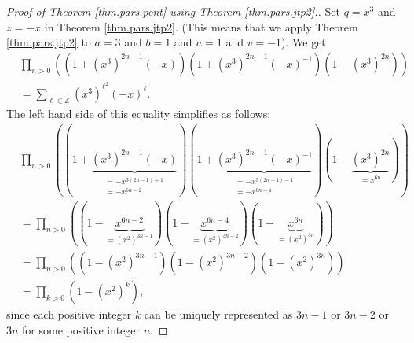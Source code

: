 \begin{proof}
[Proof of Theorem \ref{thm.pars.pent} using Theorem \ref{thm.pars.jtp2}.]Set
$q=x^{3}$ and $z=-x$ in Theorem \ref{thm.pars.jtp2}. (This means that we apply
Theorem \ref{thm.pars.jtp2} to $a=3$ and $b=1$ and $u=1$ and $v=-1$). We get%
\begin{align}
&  \prod_{n>0}\left(  \left(  1+\left(  x^{3}\right)  ^{2n-1}\left(
-x\right)  \right)  \left(  1+\left(  x^{3}\right)  ^{2n-1}\left(  -x\right)
^{-1}\right)  \left(  1-\left(  x^{3}\right)  ^{2n}\right)  \right)
\nonumber\\
&  =\sum_{\ell\in\mathbb{Z}}\left(  x^{3}\right)  ^{\ell^{2}}\left(
-x\right)  ^{\ell}. \label{pf.thm.pars.pent.1}%
\end{align}
The left hand side of this equality simplifies as follows:%
\begin{align*}
&  \prod_{n>0}\left(  \left(  1+\underbrace{\left(  x^{3}\right)
^{2n-1}\left(  -x\right)  }_{\substack{=-x^{3\left(  2n-1\right)
+1}\\=-x^{6n-2}}}\right)  \left(  1+\underbrace{\left(  x^{3}\right)
^{2n-1}\left(  -x\right)  ^{-1}}_{\substack{=-x^{3\left(  2n-1\right)
-1}\\=-x^{6n-4}}}\right)  \left(  1-\underbrace{\left(  x^{3}\right)  ^{2n}%
}_{=x^{6n}}\right)  \right) \\
&  =\prod_{n>0}\left(  \left(  1-\underbrace{x^{6n-2}}_{=\left(  x^{2}\right)
^{3n-1}}\right)  \left(  1-\underbrace{x^{6n-4}}_{=\left(  x^{2}\right)
^{3n-2}}\right)  \left(  1-\underbrace{x^{6n}}_{=\left(  x^{2}\right)  ^{3n}%
}\right)  \right) \\
&  =\prod_{n>0}\left(  \left(  1-\left(  x^{2}\right)  ^{3n-1}\right)  \left(
1-\left(  x^{2}\right)  ^{3n-2}\right)  \left(  1-\left(  x^{2}\right)
^{3n}\right)  \right) \\
&  =\prod_{k>0}\left(  1-\left(  x^{2}\right)  ^{k}\right)  ,
\end{align*}
since each positive integer $k$ can be uniquely represented as $3n-1$ or
$3n-2$ or $3n$ for some positive integer $n$.


\end{proof}
